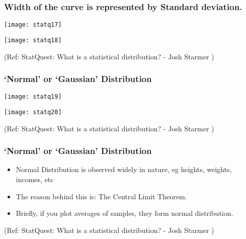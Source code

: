 \begin{frame}[fragile]\frametitle{Width of the curve is represented by Standard deviation.}

      \begin{center}
  
	   
	  \texttt{[image: statq17]}
	   
      \texttt{[image: statq18]}	   
	  	\end{center}
		

\tiny{(Ref: StatQuest: What is a statistical distribution? - Josh Starmer )}
\end{frame}

\begin{frame}[fragile]\frametitle{`Normal' or `Gaussian' Distribution}
      \begin{center}

	  
	  \texttt{[image: statq19]}
	   
   
	  \texttt{[image: statq20]}
	   
	  	\end{center}
		

\tiny{(Ref: StatQuest: What is a statistical distribution? - Josh Starmer )}
\end{frame}

\begin{frame}[fragile]\frametitle{`Normal' or `Gaussian' Distribution}

	\begin{itemize}
	\item Normal Distribution is observed widely in nature, eg heights, weights, incomes, etc
	\item The reason behind this is: The Central Limit Theorem.
	\item Briefly, if you plot averages of samples, they form normal distribution.
	
	\end{itemize}

  
\tiny{(Ref: StatQuest: What is a statistical distribution? - Josh Starmer )}
\end{frame}

